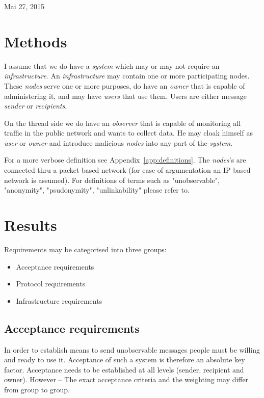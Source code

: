\documentclass[12pt,journal,compsoc,peerreview]{IEEEtran}
\begin{document}
\hfill Mai 27, 2015
\fi

\section{Methods}
I assume that we do have a \emph{system} which may or may not require an \emph{infrastructure}. An \emph{infrastructure} may contain one or more participating {nodes}. These \emph{nodes} serve one or more purposes, do have an \emph{owner} that is capable of administering it, and may have \emph{users} that use them. Users are either message \emph{sender} or \emph{recipients}.
\par
On the thread side we do have an \emph{observer} that is capable of monitoring all traffic in the public network and wants to collect data. He may cloak himself as \emph{user} or \emph{owner} and introduce malicious \emph{nodes} into any part of the \emph{system}.
\par
For a more verbose definition see Appendix~\ref{app:definitions}. The \emph{nodes}'s are connected thru a packet based network (for ease of argumentation an IP based network is assumed). For definitions of terms such as "unobservable", "anonymity", "psudonymity", "unlinkability" please refer to\cite{pfitzmann2010terminology}.


\section{Results}
Requirements may be categorised into three groups:
\begin{itemize}
	\item Acceptance requirements
	\item Protocol requirements
	\item Infrastructure requirements
\end{itemize}

\subsection{Acceptance requirements}
In order to establish means to send unobservable messages people must be willing and ready to use it. Acceptance of such a system is therefore an absolute key factor. Acceptance needs to be established at all levels (sender, recipient and owner). However -- The exact acceptance criteria and the weighting may differ from group to group.
\end{document}
